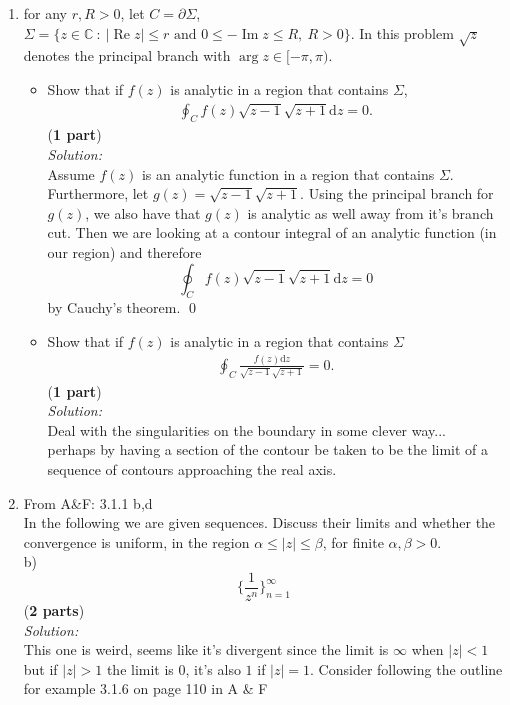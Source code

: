 \documentclass[10pt]{amsart}
\newcommand{\D}{\mathrm{d}}
\DeclareMathOperator{\real}{Re}
\DeclareMathOperator{\imag}{Im}
\theoremstyle{nonumberplain}
\begin{document}
\begin{enumerate}[label={\bf {\arabic*}:}]
\item for any $r, R > 0$, let $C = \partial \Sigma$, $\Sigma = \{z \in \mathbb C ~:~
      |\real z | \leq r \text{ and } 0 \leq -\imag z \leq R, ~ R >
    0\}$.   In this problem $\sqrt{z}$ denotes the principal branch
    with $\arg z  \in [-\pi, \pi)$.
    \begin{itemize}
    \item Show that if $f(z)$ is analytic in a region that contains $\Sigma$,
      \begin{align*}
        \oint_C f(z) \sqrt{z-1} \sqrt{z+1} \D z = 0.
      \end{align*}
(\textbf{1 part}) \\
\textit{Solution:} \\
Assume $f(z)$ is an analytic function in a region that contains $\Sigma$.
Furthermore, let $g(z) = \sqrt{z-1} \sqrt{z+1}$.
Using the principal branch for $g(z)$, we also have that $g(z)$ is analytic as well away from it's branch cut.
Then we are looking at a contour integral of an analytic function (in our region) and therefore
$$\oint_C f(z) \sqrt{z-1} \sqrt{z+1} \D z = 0$$
by Cauchy's theorem.
\qed \\

  \item Show that if $f(z)$ is analytic in a region that contains $\Sigma$
    \begin{align*}
        \oint_C \frac{f(z) \D z}{\sqrt{z-1} \sqrt{z+1}}= 0.
      \end{align*}
(\textbf{1 part}) \\
\textit{Solution:} \\
Deal with the singularities on the boundary in some clever way... \\
perhaps by having a section of the contour be taken to be the limit of a sequence of contours approaching the real axis.
\\
    \end{itemize}
\item From A\&F: 3.1.1 b,d \\
In the following we are given sequences.
Discuss their limits and whether the convergence is uniform, in the region $\alpha \leq |z| \leq \beta$, for finite $\alpha, \beta > 0$. \\
b) $$ \bigg\{ \frac 1 {z^n} \bigg\}_{n=1}^{\infty} $$
(\textbf{2 parts}) \\
\textit{Solution:}\\
This one is weird, seems like it's divergent since the limit is $\infty$ when $ |z| < 1$ but if $|z| > 1$ the limit is $0$, it's also $1$ if $|z| = 1$.
Consider following the outline for example 3.1.6 on page 110 in A \& F
\\


\end{enumerate}
\end{document}
